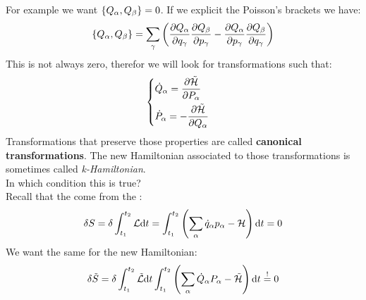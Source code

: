 For example we want $\left\{Q_{\alpha},Q_{\beta}\right\} = 0$. If we explicit the Poisson's brackets we have:
\begin{equation}
    \left\{Q_{\alpha},Q_{\beta}\right\} = \displaystyle\sum_{\gamma} \left(\dfrac{\partial Q_{\alpha}}{\partial q_{\gamma}} \dfrac{\partial Q_{\beta}}{\partial p_{\gamma}} - \dfrac{\partial Q_{\alpha}}{\partial p_{\gamma}} \dfrac{\partial Q_{\beta}}{\partial q_{\gamma}} \right)
\end{equation}
This is not always zero, therefor we will look for transformations such that:
\begin{equation}
    \begin{cases}
        \dot{Q}_{\alpha} = \dfrac{\partial \tilde{\mathcal{H}}}{\partial P_{\alpha}} \\[8pt]
        \dot{P}_{\alpha} = -\dfrac{\partial \tilde{\mathcal{H}}}{\partial Q_{\alpha}}
    \end{cases}
\end{equation}
Transformations that preserve those properties are called \textbf{canonical transformations}. The new Hamiltonian associated to those transformations is sometimes called \textit{k-Hamiltonian}.\\
In which condition this is true?\\
Recall that the \hamiltonref\;come from the \hpquotemath :
\begin{equation}
    \delta S = \delta \int_{t_1}^{t_2}\mathcal{L} \mathrm{d}t = \int_{t_1}^{t_2} \left(\displaystyle\sum_{\alpha}\dot{q}_{\alpha}p_{\alpha} - \mathcal{H}\right) \mathrm{d}t =0
\end{equation}
We want the same for the new Hamiltonian:
\begin{equation}
    \delta \tilde{S} = \delta \int_{t_1}^{t_2}\tilde{\mathcal{L}} \mathrm{d}t \int_{t_1}^{t_2} \left(\displaystyle\sum_{\alpha}\dot{Q}_{\alpha}P_{\alpha} - \tilde{\mathcal{H}}\right) \mathrm{d}t \overset{!}{=} 0
\end{equation}
